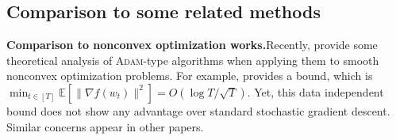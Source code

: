\documentclass[11pt]{article}
\theoremstyle{k}
\begin{document}
%

\subsection{Comparison to some related methods} \label{app:related}

\textbf{Comparison to nonconvex optimization works.}\hspace{0.1in}Recently, \cite{ZRSKK18,CLSH19,WWB18,ZTYCG18,ZS18,LO18} provide some theoretical analysis 
of \textsc{Adam}-type algorithms when applying them to smooth nonconvex optimization problems.
For example, \cite{CLSH19} provides a bound,
which is $\min_{t \in [T]} \mathbb{E}[\| \nabla f(w_t) \|^2 ] = O(\log T / \sqrt{T}) $.
Yet, this data independent bound does not show any advantage over standard stochastic gradient descent. Similar concerns appear in other papers.
\end{document}
